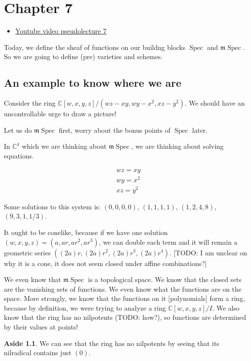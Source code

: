 \documentclass{book}
\newcommand{\C}{\ensuremath{\mathbb{C}}}
\newcommand{\Spec}{\operatorname{Spec}}
\newcommand{\m}{\mathfrak{m}}
\newcommand{\mSpec}{\m\operatorname{Spec}}
\theoremstyle{definition}
\newtheorem{aside}[theorem]{Aside}
\begin{document}
\chapter{Chapter 7}
\begin{itemize}
\item \href{https://www.youtube.com/watch?v=4KJwmiYHVk4}{Youtube video pseudolecture 7}
\end{itemize}
Today, we define the sheaf of functions on our buildng blocks $\Spec$ and $\mSpec$.
So we are going to define (pre) varieties and schemes.

\section{An example to know where we are}
Consider the ring $\C[w, x, y, z]/(wz - xy, wy - x^2, xz - y^2)$. We should
have an uncontrollable urge to draw a picture! 

Let us do $\mSpec$ first, worry about the bonus points of $\Spec$ later.

In $\C^4$ which we are thinking about $\mSpec$, we are thinking about
solving equations.

\begin{align*}
&wz = xy \\
&wy = x^2 \\
&xz = y^2
\end{align*}

Some solutions to this system is:
$(0, 0, 0, 0)$, $(1, 1, 1, 1)$, $(1, 2, 4, 8)$, $(9, 3, 1, 1/3)$.

It ought to be conelike, because if we have one solution $(w, x, y, z) = (a, ar, ar^2, ar^3)$, 
we can double each term and it will remain a geometric series $((2a)r, (2a)r^2, (2a)r^3, (2a)r^4)$.
[TODO: I am unclear on why it is a cone, it does not seem closed under affine combinations?]


We even know that $\mSpec$ is a topological space. We know that the closed sets
are the vanishing sets of functions. We even know what the functions are on
the space. More strongly, we know that the functions on it [polynomials]
form a ring, because by definition, we were trying to analyze a ring
$\C[w, x, y, z]/I$. We also know that the ring has no nilpotents (TODO: how?),
so functions are determined by their values at points!                                                    

\begin{aside}
We can see that the ring has no nilpotents by seeing that its nilradical
contains just $(0)$.
\end{aside}
\end{document}
